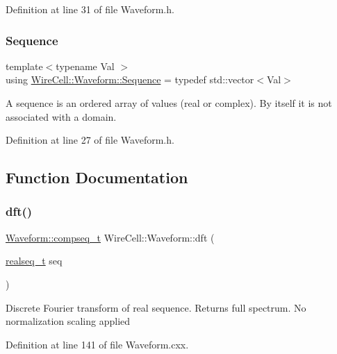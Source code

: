 Definition at line 31 of file Waveform.\+h.

\mbox{\label{namespace_wire_cell_1_1_waveform_a1d2a1b672e3b220dcd64a994531de95d}} 
\subsubsection{\texorpdfstring{Sequence}{Sequence}}
{\footnotesize\ttfamily template$<$typename Val $>$ \\
using \hyperlink{namespace_wire_cell_1_1_waveform_a1d2a1b672e3b220dcd64a994531de95d}{Wire\+Cell\+::\+Waveform\+::\+Sequence} = typedef std\+::vector$<$Val$>$}

A sequence is an ordered array of values (real or complex). By itself it is not associated with a domain. 

Definition at line 27 of file Waveform.\+h.



\subsection{Function Documentation}
\mbox{\label{namespace_wire_cell_1_1_waveform_a6cfae9f74c1bf06f69d6991f3f82cef5}} 
\subsubsection{\texorpdfstring{dft()}{dft()}}
{\footnotesize\ttfamily \hyperlink{namespace_wire_cell_1_1_waveform_a7e4a8d371f774438bb360e7d1dcb583a}{Waveform\+::compseq\+\_\+t} Wire\+Cell\+::\+Waveform\+::dft (\begin{DoxyParamCaption}\item[{\hyperlink{namespace_wire_cell_1_1_waveform_a479175e541c8545e87cd8063b74b6956}{realseq\+\_\+t}}]{seq }\end{DoxyParamCaption})}

Discrete Fourier transform of real sequence. Returns full spectrum. No normalization scaling applied 

Definition at line 141 of file Waveform.\+cxx.


